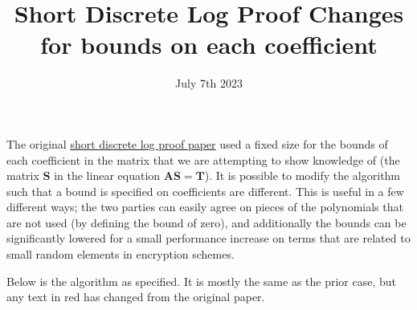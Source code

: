 \documentclass{article}
\title{Short Discrete Log Proof Changes for bounds on each coefficient}
\date{July 7th 2023}
\begin{document}
\maketitle

The original \href{https://eprint.iacr.org/2019/057}{short discrete log proof paper} used a fixed size for the bounds of each coefficient in the matrix that we are attempting to show knowledge of (the matrix $\mathbf{S}$ in the linear equation $\mathbf{AS} = \mathbf{T}$). It is possible to modify the algorithm such that a bound is specified on coefficients are different. This is useful in a few different ways; the two parties can easily agree on pieces of the polynomials that are not used (by defining the bound of zero), and additionally the bounds can be significantly lowered for a small performance increase on terms that are related to small random elements in encryption schemes.

Below is the algorithm as specified. It is mostly the same as the prior case, but any text in red has changed from the original paper. 
\end{document}
